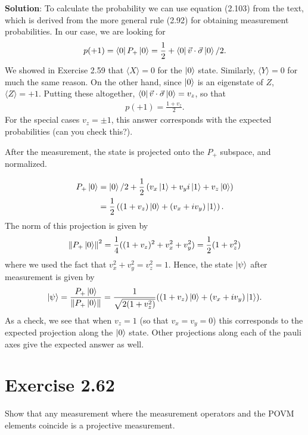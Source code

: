 \documentclass{book}
\begin{document}
    \textbf{Solution}: To calculate the probability we can use equation (2.103) from the text, which is derived from the more general rule (2.92) for obtaining measurement probabilities. In our case, we are looking for
    \begin{align}
        p(+1) = \bra{0} P_+ \ket{0} = \frac{1}{2} + \bra{0}\vec{v} \cdot \vec{\sigma}\ket{0}/2.
    \end{align}
    We showed in Exercise 2.59 that $\langle X \rangle = 0$ for the $\ket{0}$ state. Similarly, $\langle Y \rangle = 0$ for much the same reason. On the other hand, since $\ket{0}$ is an eigenstate of $Z$, $\langle Z \rangle = +1$. Putting these altogether, $\bra{0}\vec{v} \cdot \vec{\sigma}\ket{0} = v_z$, so that 
    \begin{align}
        p(+1) = \frac{1 + v_z}{2}.
    \end{align}
    For the special cases $v_z = \pm 1$, this answer corresponds with the expected probabilities (can you check this?). 

    After the measurement, the state is projected onto the $P_+$ subspace, and normalized. 

    \begin{align}
    \begin{aligned}
        P_+ \ket{0} &= \ket{0}/2 + \frac{1}{2} \left(v_x \ket{1} + v_y i \ket{1} + v_z \ket
        0\right) \\
        &= \frac{1}{2} \left((1+v_z)\ket{0} + (v_x + i v_y) \ket{1}\right).
    \end{aligned}
    \end{align}
    The norm of this projection is given by
    \begin{align}
        \norm{P_+ \ket{0}}^2 = \frac{1}{4} ((1+v_z)^2 + v_x^2 + v_y^2) = \frac{1}{2}(1+v_z^2)
    \end{align}
    where we used the fact that $v_x^2 + v_y^2 = v_z^2 = 1$. Hence, the state $\ket{\psi}$ after measurement is given by
    \begin{align}
        \ket{\psi} = \frac{P_+ \ket{0}}{\norm{P_+ \ket{0}}} = \frac{1}{\sqrt{2(1+v_z^2)}}((1+v_z)\ket{0} + (v_x + i v_y)\ket{1}).
    \end{align}
    As a check, we see that when $v_z = 1$ (so that $v_x = v_y = 0$) this corresponds to the expected projection along the $\ket{0}$ state. Other projections along each of the pauli axes give the expected answer as well.

\section*{Exercise 2.62}
    Show that any measurement where the measurement operators and the POVM elements coincide is a projective measurement.
\end{document}
